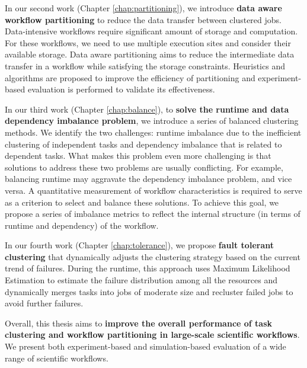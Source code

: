In our second work \cite{Integration2012, Chen2011a} (Chapter \ref{chap:partitioning}), we introduce \textbf{data aware workflow partitioning} to reduce the data transfer between clustered jobs. Data-intensive workflows require significant amount of storage and computation. For these workflows, we need to use multiple execution sites and consider their available storage. Data aware partitioning aims to reduce the intermediate data transfer in a workflow while satisfying the storage constraints. Heuristics and algorithms are proposed to improve the efficiency of partitioning and experiment-based evaluation is performed to validate its effectiveness.  

In our third work \cite{Chen2013a,Chen2013b} (Chapter \ref{chap:balance}), to \textbf{solve the runtime and data dependency imbalance problem}, we introduce a series of balanced clustering methods. 
We identify the two challenges: runtime imbalance due to the inefficient clustering of independent tasks and dependency imbalance that is related to dependent tasks. What makes this problem even more challenging is that solutions to address these two problems are usually conflicting. For example, balancing runtime may aggravate the dependency imbalance problem, and vice versa. A quantitative measurement of workflow characteristics is required to serve as a criterion to select and balance these solutions. To achieve this goal, we propose a series of imbalance metrics to reflect the internal structure (in terms of runtime and dependency) of the workflow. 

In our fourth work \cite{Chen2012} (Chapter \ref{chap:tolerance}), we propose \textbf{fault tolerant clustering} that dynamically adjusts the clustering strategy based on the current trend of failures. During the runtime, this approach uses Maximum Likelihood Estimation to estimate the failure distribution among all the resources and dynamically merges tasks into jobs of moderate size and recluster failed jobs to avoid further failures.


Overall, this thesis aims to \textbf{improve the overall performance of task clustering and workflow partitioning in large-scale scientific workflows}. We present both experiment-based and simulation-based evaluation of a wide range of scientific workflows. 



